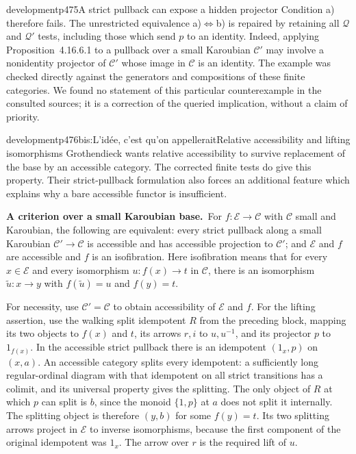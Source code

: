\begin{dcomment}{development}{p475}{A strict pullback can expose a hidden projector}
Condition a) therefore fails. The unrestricted equivalence a)$\Leftrightarrow$b) is repaired by retaining all $\mathcal Q$ and $\mathcal Q'$ tests, including those which send $p$ to an identity. Indeed, applying Proposition~4.16.6.1 to a pullback over a small Karoubian $\mathcal C'$ may involve a nonidentity projector of $\mathcal C'$ whose image in $\mathcal C$ is an identity. The example was checked directly against the generators and compositions of these finite categories. We found no statement of this particular counterexample in the consulted sources; it is a correction of the queried implication, without a claim of priority.
\end{dcomment}

\begin{dcomment}{development}{p476bis:L'idée, c'est qu'on appellerait}{Relative accessibility and lifting isomorphisms}
Grothendieck wants relative accessibility to survive replacement of the base by an accessible category. The corrected finite tests do give this property. Their strict-pullback formulation also forces an additional feature which explains why a bare accessible functor is insufficient.

\textbf{A criterion over a small Karoubian base.}\ours\
For $f:\mathcal E\to\mathcal C$ with $\mathcal C$ small and Karoubian, the following are equivalent: every strict pullback along a small Karoubian $\mathcal C'\to\mathcal C$ is accessible and has accessible projection to $\mathcal C'$; and $\mathcal E$ and $f$ are accessible and $f$ is an isofibration. Here isofibration means that for every $x\in\mathcal E$ and every isomorphism $u:f(x)\to t$ in $\mathcal C$, there is an isomorphism $\widetilde u:x\to y$ with $f(\widetilde u)=u$ and $f(y)=t$.

For necessity, use $\mathcal C'=\mathcal C$ to obtain accessibility of $\mathcal E$ and $f$. For the lifting assertion, use the walking split idempotent $R$ from the preceding block, mapping its two objects to $f(x)$ and $t$, its arrows $r,i$ to $u,u^{-1}$, and its projector $p$ to $1_{f(x)}$. In the accessible strict pullback there is an idempotent $(1_x,p)$ on $(x,a)$. An accessible category splits every idempotent: a sufficiently long regular-ordinal diagram with that idempotent on all strict transitions has a colimit, and its universal property gives the splitting. The only object of $R$ at which $p$ can split is $b$, since the monoid $\{1,p\}$ at $a$ does not split it internally. The splitting object is therefore $(y,b)$ for some $f(y)=t$. Its two splitting arrows project in $\mathcal E$ to inverse isomorphisms, because the first component of the original idempotent was $1_x$. The arrow over $r$ is the required lift of $u$.


\end{dcomment}

